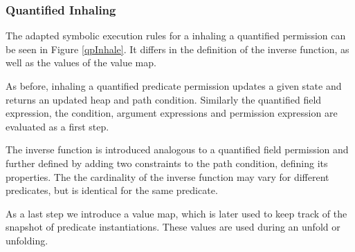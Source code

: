 \documentclass[12pt]{article}
\begin{document}
\subsubsection{Quantified Inhaling} 
\label{qpInhaleSec}
The adapted symbolic execution rules for a inhaling a quantified permission can be seen in Figure \ref{qpInhale}. It differs in the definition of the inverse function, as well as the values of the value map.

As before, inhaling a quantified predicate permission updates a given state and returns an updated heap and path condition. Similarly the quantified field expression, the condition, argument expressions and permission expression are evaluated as a first step.

The inverse function is introduced analogous to a quantified field permission and further defined by adding two constraints to the path condition, defining its properties. The the cardinality of the inverse function may vary for different predicates, but is identical for the same predicate.

As a last step we introduce a value map, which is later used to keep track of the snapshot of predicate instantiations. These values are used during an unfold or unfolding.
\end{document}

